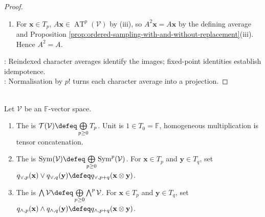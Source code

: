 \begin{proposition}
\begin{proof}
\begin{enumerate}[label=(\roman*)]
Hence $\sign(\sigma\tau)=\sign(\sigma)\sign(\tau)$ by Theorem \ref{thm:determinant-basic-laws}(vi). The identity also holds for $p=0$.\\
For $\tau\in G_p$, $\lambda_{\tau}A=\frac{1}{p!}\sum\limits_{\sigma\in G_p}\sign(\sigma)\lambda_{\tau\sigma}=\sign(\tau)A$ by the reindexing $\rho=\tau\sigma$. Hence $\operatorname{im}A\subseteq\operatorname{AT}^{p}(\mathcal{V})$.\\
If $\mathbf{z}\in\operatorname{AT}^{p}(\mathcal{V})$, then $A\mathbf{z}=\frac{1}{p!}\sum\limits_{\sigma\in G_p}\sign(\sigma)^2\mathbf{z}=\mathbf{z}$ by Proposition \ref{prop:ordered-sampling-with-and-without-replacement}(iii). Thus $\operatorname{AT}^{p}(\mathcal{V})\subseteq\operatorname{im}A$; $\operatorname{im}A=\operatorname{AT}^{p}(\mathcal{V})$.
\item For $\mathbf{x}\in T_p$, $A\mathbf{x}\in\operatorname{AT}^{p}(\mathcal{V})$ by (iii), so $A^2\mathbf{x}=A\mathbf{x}$ by the defining average and Proposition \ref{prop:ordered-sampling-with-and-without-replacement}(iii). Hence $A^2=A$.
\end{enumerate}
: Reindexed character averages identify the images; fixed-point identities establish idempotence.\\
: Normalisation by $p!$ turns each character average into a projection.
\end{proof}
\end{proposition}

\begin{definition} \label{def:graded-tensor-symmetric-exterior-algebras} \\
Let $\mathcal{V}$ be an $\mathbb{F}$-vector space.
\begin{enumerate}[label=(\roman*)]
\setlength{\itemsep}{0pt}
\item The  is $\mathcal{T}(\mathcal{V})\defeq\bigoplus\limits_{p\geq0}T_p$. Unit is $1\in T_0=\mathbb{F}$, homogeneous multiplication is tensor concatenation.
\item The  is $\operatorname{Sym}(\mathcal{V})\defeq\bigoplus\limits_{p\geq0}\operatorname{Sym}^{p}(\mathcal{V})$. For $\mathbf{x}\in T_p$ and $\mathbf{y}\in T_q$, set $q_{\vee,p}(\mathbf{x})\vee q_{\vee,q}(\mathbf{y})\defeq q_{\vee,p+q}(\mathbf{x}\otimes\mathbf{y})$.
\item The  is $\bigwedge\mathcal{V}\defeq\bigoplus\limits_{p\geq0}\bigwedge^{p}\mathcal{V}$. For $\mathbf{x}\in T_p$ and $\mathbf{y}\in T_q$, set $q_{\wedge,p}(\mathbf{x})\wedge q_{\wedge,q}(\mathbf{y})\defeq q_{\wedge,p+q}(\mathbf{x}\otimes\mathbf{y})$.
\end{enumerate}
\end{definition}

